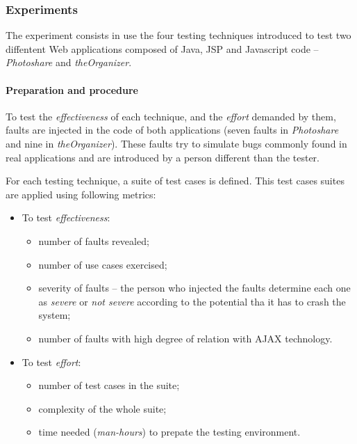 \documentclass[a4paper]{article}
\begin{document}
\begin {itemize}
\subsubsection{Experiments}

The experiment consists in use the four testing techniques introduced to test two diffentent Web applications composed of Java, JSP and Javascript code -- \emph{Photoshare} and \emph{theOrganizer}.

\paragraph{Preparation and procedure}

To test the \emph{effectiveness} of each technique, and the \emph{effort} demanded by them, faults are injected in the code of both applications (seven faults in \emph{Photoshare} and nine in \emph{theOrganizer}).
These faults try to simulate bugs commonly found in real applications and are introduced by a person different than the tester.

For each testing technique, a suite of test cases is defined.
This test cases suites are applied using following metrics:

\begin{itemize}

\item To test \emph{effectiveness}:
\begin{itemize}
\item number of faults revealed;
\item number of use cases exercised;
\item severity of faults -- the person who injected the faults determine each one as \emph{severe} or \emph{not severe} according to the potential tha it has to crash the system;
\item number of faults with high degree of relation with AJAX technology.
\end{itemize}

\item To test \emph{effort}:
\begin{itemize}
\item number of test cases in the suite;
\item complexity of the whole suite;
\item time needed (\emph{man-hours}) to prepate the testing environment.
\end{itemize}

\end{itemize} 


\end{itemize}
\end{document}
